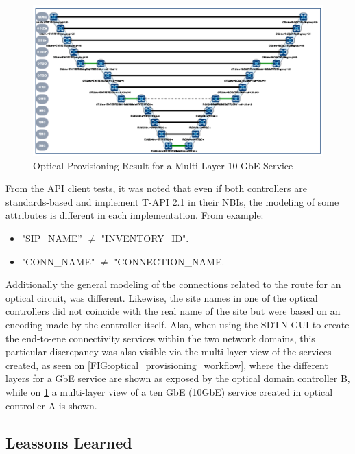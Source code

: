 \documentclass[a4paper,fleqn]{cas-dc}
\begin{document}
\begin{figure}
	\centering
		\includegraphics[width=\linewidth]{figs/optical_provisioning_result.png}
	\caption{Optical Provisioning Result for a Multi-Layer 10 GbE Service}
	\label{FIG:optical_provisioning_result}
\end{figure}

From the API client tests, it was noted that even if both controllers are standards-based and implement T-API 2.1 in their NBIs, the modeling of some attributes is different in each implementation. From example:
\begin{itemize}
    \item "SIP\_NAME” $\neq$ "INVENTORY\_ID". 
    \item "CONN\_NAME" $\neq$ "CONNECTION\_NAME. 
\end{itemize}

Additionally the general modeling of the connections related to the route for an optical circuit, was different. Likewise, the site names in one of the optical controllers did not coincide with the real name of the site but were based on an encoding made by the controller itself. Also, when using the SDTN GUI to create the end-to-ene connectivity services within the two network domains, this particular discrepancy was also visible via the multi-layer view of the services created, as seen on \cref{FIG:optical_provisioning_workflow}, where the different layers for a GbE service are shown as exposed by the optical domain controller B, while on \cref{FIG:optical_provisioning_result} a multi-layer view of a ten GbE (10GbE) service created in optical controller A is shown.

\subsection{Leassons Learned}
\end{document}
